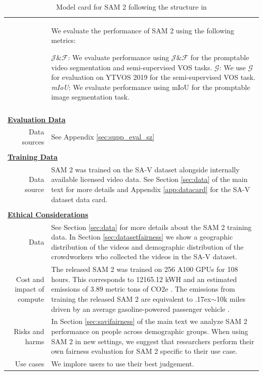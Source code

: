 \documentclass[]{fairmeta}
\newcommand{\app}{\raise.17ex\hbox{$\scriptstyle\sim$}}
\newcommand{\mg}{$\mathcal{G}$}
\newcommand{\jf}{$\mathcal{J}\&\mathcal{F}$\xspace}
\begin{document}
\begin{table}[!htbp]
\begin{tabular*}{\linewidth}{r|p{10cm}}
& We evaluate the performance of SAM 2 using the following metrics: \vspace{0.5em} 

\textit{\jf}: We evaluate performance using \jf  \citep{Pont-Tuset_arXiv_2017} for the promptable video segmentation and semi-supervised VOS tasks.
\newline
\textit{\mg}: We use \mg \space for evaluation on YTVOS 2019 for the semi-supervised VOS task.
\newline
 \textit{mIoU}: We evaluate performance using mIoU for the promptable image segmentation task.
\\

\multicolumn{2}{c}{} \\

\multicolumn{2}{l}{\bf\underline{Evaluation Data}} \\
Data sources & See Appendix \ref{sec:supp_eval_sz} \\
\multicolumn{2}{c}{} \\
\multicolumn{2}{l}{\bf\underline{Training Data}} \\
Data source & SAM 2 was trained on the SA-V dataset alongside internally available licensed video data. See Section \ref{sec:data} of the main text for more details and Appendix \ref{app:datacard} for the SA-V dataset data card.\\
\multicolumn{2}{c}{} \\
\multicolumn{2}{l}{\bf\underline{Ethical Considerations}} \\
Data &
See Section \ref{sec:data} for more details about the SAM 2 training data. In Section \ref{sec:datasetfairness} we show a geographic distribution of the videos and demographic distribution of the crowdworkers who collected the videos in the SA-V dataset. \\

Cost and impact of compute & The released SAM 2 was trained on 256 A100 GPUs for 108 hours. This corresponds to 12165.12 kWH and an estimated emissions of 3.89 metric tons of CO2e \citep{patterson2021carbon, lacoste2019quantifying}. The emissions from training the released SAM 2 are equivalent to \app10k miles driven by an average gasoline-powered passenger vehicle \citep{epa2022}. \\
Risks and harms & In Section \ref{sec:savifairness} of the main text we analyze SAM 2 performance on people across demographic groups. When using SAM 2 in new settings, we suggest that researchers perform their own fairness evaluation for SAM 2 specific to their use case.  \\
Use cases & We implore users to use their best judgement. \\
\end{tabular*}
\label{tab:modelcard}\vspace{10mm}
\caption{Model card for SAM 2 following the structure in \cite{mitchell2019model}}
\end{table}
\clearpage
\end{document}
